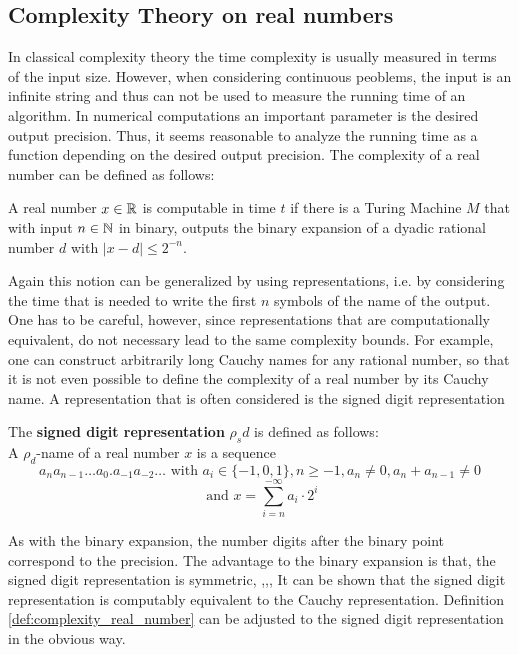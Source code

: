	\subsection{Complexity Theory on real numbers}
		In classical complexity theory the time complexity is usually measured in terms of the input size.
		However, when considering continuous peoblems, the input is an infinite string and thus can not 
		be used to measure the running time of an algorithm.
		In numerical computations an important parameter is the desired output precision.
		Thus, it seems reasonable to analyze the running time as a function depending on the desired output precision.
		The complexity of a real number can be defined as follows:
		\begin{definition}\label{def:complexity_real_number}
			A real number $x \in \mathbb R$ is computable in time $t$ if there is a Turing Machine $M$ that with input $n \in \mathbb N$ in binary, 
			outputs the binary expansion of a dyadic rational number $d$ with $| x - d | \leq 2^{-n}$.  
		\end{definition}
		Again this notion can be generalized by using representations, i.e. by considering the time that is needed to write the first $n$ symbols
		of the name of the output.
		One has to be careful, however, since representations that are computationally equivalent, do not necessary lead to the same complexity bounds.
		For example, one can construct arbitrarily long Cauchy names for any rational number, so that it is not even possible to define the complexity 
		of a real number by its Cauchy name.
		A representation that is often considered is the signed digit representation
		\begin{definition}
			The \textbf{signed digit representation} $\rho_sd$ is defined as follows: \\
			A $\rho_d$-name of a real number $x$ is a sequence 
			$$a_n a_{n-1} \dots a_0 . a_{-1} a_{-2} \dots \text{ with } a_i \in \{-1,0,1\}, n \geq -1, a_n \neq 0, a_n + a_{n-1} \neq 0$$
			$$ \text{ and } x = \sum_{i=n}^{-\infty} a_i \cdot 2^i $$  
		\end{definition}
		As with the binary expansion, the number digits after the binary point correspond to the precision.
		The advantage to the binary expansion is that, the signed digit representation is symmetric, ,,,
		It can be shown that the signed digit representation is computably equivalent to the Cauchy representation.
		Definition \ref{def:complexity_real_number} can be adjusted to the signed digit representation in the obvious way.\\
